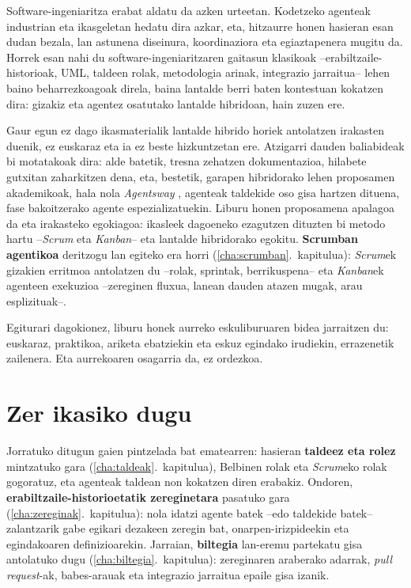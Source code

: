 Software-ingeniaritza erabat aldatu da azken urteetan.
Kodetzeko agenteak industrian eta ikasgeletan hedatu dira azkar, eta, hitzaurre honen hasieran esan dudan bezala, lan astunena diseinura, koordinaziora eta egiaztapenera mugitu da.
Horrek esan nahi du software-ingeniaritzaren gaitasun klasikoak --erabiltzaile-historioak, UML, taldeen rolak, metodologia arinak, integrazio jarraitua-- lehen baino beharrezkoagoak direla,
baina lantalde berri baten kontestuan kokatzen dira: gizakiz eta agentez osatutako lantalde hibridoan, hain zuzen ere.

Gaur egun ez dago ikasmaterialik lantalde hibrido horiek antolatzen irakasten duenik, ez euskaraz eta ia ez beste hizkuntzetan ere.
Atzigarri dauden baliabideak bi motatakoak dira: alde batetik, tresna zehatzen dokumentazioa, hilabete gutxitan zaharkitzen dena, eta, bestetik, garapen hibridorako lehen proposamen akademikoak, hala nola \textit{Agentsway} \parencite{bandara2025agentsway}, agenteak taldekide oso gisa hartzen dituena, fase bakoitzerako agente espezializatuekin.
Liburu honen proposamena apalagoa da eta irakasteko egokiagoa: ikasleek dagoeneko ezagutzen dituzten bi metodo hartu --\textit{Scrum} eta \textit{Kanban}-- eta lantalde hibridorako egokitu.
\textbf{Scrumban agentikoa} deritzogu lan egiteko era horri (\ref{cha:scrumban}.~kapitulua): \textit{Scrum}ek gizakien erritmoa antolatzen du --rolak, sprintak, berrikuspena--
eta \textit{Kanban}ek agenteen exekuzioa --zereginen fluxua, lanean dauden atazen mugak, arau esplizituak--.

Egiturari dagokionez, liburu honek aurreko eskuliburuaren bidea jarraitzen du: euskaraz, praktikoa, ariketa ebatziekin eta eskuz egindako irudiekin, errazenetik zailenera.
Eta aurrekoaren osagarria da, ez ordezkoa.

\section{Zer ikasiko dugu}

Jorratuko ditugun gaien pintzelada bat ematearren: hasieran \textbf{taldeez eta rolez} mintzatuko gara (\ref{cha:taldeak}.~kapitulua), Belbinen rolak eta \textit{Scrum}eko rolak gogoratuz, eta agenteak taldean non kokatzen diren erabakiz.
Ondoren, \textbf{erabiltzaile-historioetatik zereginetara} pasatuko gara (\ref{cha:zereginak}.~kapitulua): nola idatzi agente batek --edo taldekide batek-- zalantzarik gabe egikari dezakeen zeregin bat, onarpen-irizpideekin eta egindakoaren definizioarekin.
Jarraian, \textbf{biltegia} lan-eremu partekatu gisa antolatuko dugu (\ref{cha:biltegia}.~kapitulua): zereginaren araberako adarrak, \textit{pull request}-ak, babes-arauak eta integrazio jarraitua epaile gisa izanik.

